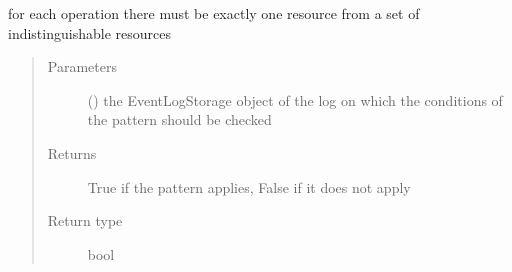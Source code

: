\documentclass[letterpaper,10pt,english]{sphinxmanual}
\begin{document}
\begin{fulllineitems}

\begin{fulllineitems}
\label{\detokenize{event_log_analyzer:event_log_analyzer.pattern_library.manufacturing_scheduling_patterns.IndistinguishableResource.pattern_applies}}
\sphinxAtStartPar
for each operation there must be exactly one resource from a set of indistinguishable resources
\begin{quote}\begin{description}
\item[{Parameters}] \leavevmode
\sphinxAtStartPar
{} ({\hyperref[\detokenize{event_log_analyzer:event_log_analyzer.event_log.EventLogStorage}]{}}) \textendash{} the EventLogStorage object of the log on which the conditions of the pattern should be checked

\item[{Returns}] \leavevmode
\sphinxAtStartPar
True if the pattern applies, False if it does not apply

\item[{Return type}] \leavevmode
\sphinxAtStartPar
bool

\end{description}\end{quote}

\end{fulllineitems}


\end{fulllineitems}

\end{document}
